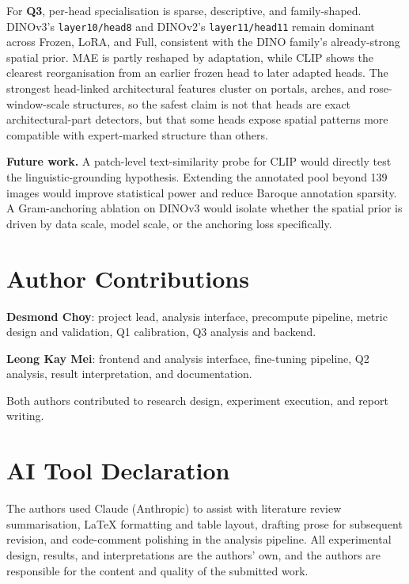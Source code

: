 \documentclass{article}
\begin{document}
For \textbf{Q3}, per-head specialisation is sparse, descriptive, and
family-shaped. DINOv3's \texttt{layer10/head8} and DINOv2's
\texttt{layer11/head11} remain dominant across Frozen, LoRA, and Full,
consistent with the DINO family's already-strong spatial prior. MAE is partly
reshaped by adaptation, while CLIP shows the clearest reorganisation from an
earlier frozen head to later adapted heads. The strongest head-linked
architectural features cluster on portals, arches, and rose-window-scale
structures, so the safest
claim is not that heads are exact architectural-part detectors, but that some
heads expose spatial patterns more compatible with expert-marked structure
than others.

\textbf{Future work.} A patch-level text-similarity probe for CLIP would
directly test the linguistic-grounding hypothesis. Extending the annotated pool
beyond 139 images would improve statistical power and reduce Baroque annotation
sparsity. A Gram-anchoring ablation on DINOv3 would isolate whether the spatial
prior is driven by data scale, model scale, or the anchoring loss specifically.

\section{Author Contributions}

\textbf{Desmond Choy}: project lead, analysis interface, precompute pipeline,
metric design and validation, Q1 calibration, Q3 analysis and backend.

\textbf{Leong Kay Mei}: frontend and analysis interface, fine-tuning pipeline, Q2 analysis, result interpretation, and documentation.

Both authors contributed to research design, experiment execution, and report
writing.

\section{AI Tool Declaration}

The authors used Claude (Anthropic) to assist with literature review
summarisation, LaTeX formatting and table layout, drafting prose for
subsequent revision, and code-comment polishing in the analysis pipeline.
All experimental design, results, and interpretations are the authors' own,
and the authors are responsible for the content and quality of the submitted
work.
\end{document}
